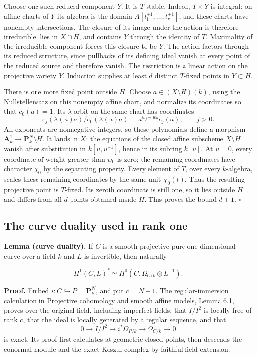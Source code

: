 \documentclass[11pt,a4paper,openany]{report}
\newcounter{none}
\begin{document}
Choose one such reduced component \(Y\). It is \(T\)-stable. Indeed, \(T\times Y\) is integral: on affine charts of \(Y\) its algebra is the domain \(A[t_1^{\pm1},\ldots,t_r^{\pm1}]\), and these charts have nonempty intersections. The closure of its image under the action is therefore irreducible, lies in \(X\cap H\), and contains \(Y\) through the identity of \(T\). Maximality of the irreducible component forces this closure to be \(Y\). The action factors through its reduced structure, since pullbacks of its defining ideal vanish at every point of the reduced source and therefore vanish. The restriction is a linear action on the projective variety \(Y\). Induction supplies at least \(d\) distinct \(T\)-fixed points in \(Y\subset H\).

There is one more fixed point outside \(H\). Choose \(a\in(X\setminus H)(k)\), using the Nullstellensatz on this nonempty affine chart, and normalize its coordinates so that \(c_0(a)=1\). Its \(\lambda\)-orbit on the same chart has coordinates \[
 c_j(\lambda(u)a)/c_0(\lambda(u)a)
       =u^{w_j-w_0}c_j(a),\qquad j>0.
\] All exponents are nonnegative integers, so these polynomials define a morphism \(\mathbf A^1_k\to\mathbf P^N_k\setminus H\). It lands in \(X\): the equations of the closed affine subscheme \(X\setminus H\) vanish after substitution in \(k[u,u^{-1}]\), hence in its subring \(k[u]\). At \(u=0\), every coordinate of weight greater than \(w_0\) is zero; the remaining coordinates have character \(\chi_0\) by the separating property. Every element of \(T\), over every \(k\)-algebra, scales these remaining coordinates by the same unit \(\chi_0(t)\). Thus the resulting projective point is \(T\)-fixed. Its zeroth coordinate is still one, so it lies outside \(H\) and differs from all \(d\) points obtained inside \(H\). This proves the bound \(d+1\). \(\square\)

\subsection{The curve duality used in rank one}\label{AG-RG-03-the-curve-duality-used-in-rank-one}

\textbf{Lemma (curve duality).} If \(C\) is a smooth projective pure one-dimensional curve over a field \(k\) and \(L\) is invertible, then naturally

\[
H^1(C,L)^*\simeq
H^0(C,\Omega_{C/k}\otimes L^{-1}).
\]

\textbf{Proof.} Embed \(i:C\hookrightarrow P=\mathbf P^N_k\), and put \(c=N-1\). The regular-immersion calculation in \href{https://github.com/KokunoYumeto/open-math-courses/blob/main/docs/courses/AG-RG/AG-RG-S02.md}{Projective cohomology and smooth affine models}, Lemma 6.1, proves over the original field, including imperfect fields, that \(I/I^2\) is locally free of rank \(c\), that the ideal is locally generated by a regular sequence, and that \[
0\longrightarrow I/I^2\longrightarrow i^*\Omega_{P/k}
\longrightarrow\Omega_{C/k}\longrightarrow0
\] is exact. Its proof first calculates at geometric closed points, then descends the conormal module and the exact Koszul complex by faithful field extension.
\end{document}
